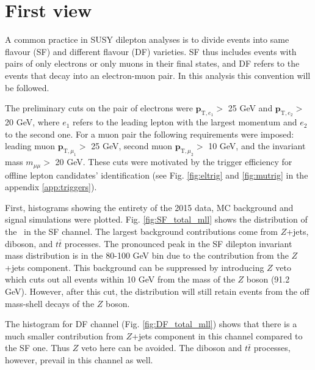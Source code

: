 \section{First view}

A common practice in SUSY dilepton analyses is to divide events into same flavour (SF) and different flavour (DF) varieties. SF thus includes events with pairs of only electrons or only muons in their final states, and DF refers to the events that decay into an electron-muon pair. In this analysis this convention will be followed.

The preliminary cuts on the pair of electrons were $\mathbf{p}_{\text{T},e_1}>$ 25 GeV and $\mathbf{p}_{\text{T},e_2}>$ 20 GeV, where $e_1$ refers to the leading lepton with the largest momentum and $e_2$ to the second one.  For a muon pair the following requirements were imposed: leading muon $\mathbf{p}_{\text{T},\mu_1}>$ 25 GeV, second muon $\mathbf{p}_{\text{T},\mu_2}>$ 10 GeV, and the invariant mass $m_{\mu \mu}>$ 20 GeV. These cuts were motivated by the trigger efficiency for offline lepton candidates' identification (see Fig. \ref{fig:eltrig} and \ref{fig:mutrig} in the appendix \ref{app:triggers}).

First, histograms showing the entirety of the 2015 data, MC background and signal simulations were plotted. Fig. \ref{fig:SF_total_mll} shows the distribution of the \dileptonmass \, in the SF channel. The largest background contributions come from $Z$+jets, diboson, and $t\bar{t}$ processes. 
The pronounced peak in the SF dilepton invariant mass distribution is in the 80-100 GeV bin due to the contribution from the $Z$+jets component. This background can be suppressed by introducing $Z$ veto which cuts out all events within 10 GeV from the mass of the $Z$ boson (91.2 GeV). However, after this cut, the distribution will still retain events from the off mass-shell decays of the $Z$ boson. 

The histogram for DF channel (Fig. \ref{fig:DF_total_mll}) shows that there is a much smaller contribution from $Z$+jets component in this channel compared to the SF one. Thus $Z$ veto here can be avoided. The diboson and $t\bar{t}$ processes, however, prevail in this channel as well. 

